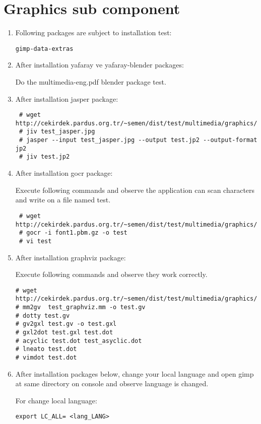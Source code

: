 \documentclass[a4paper,10pt]{article}
\begin{document}
\section{Graphics sub component}
\begin{enumerate}
\item Following packages are subject to installation test:
\begin{verbatim}
gimp-data-extras 
\end{verbatim}
\item After installation yafaray ve yafaray-blender packages:

Do the multimedia-eng.pdf blender package test.

\item After installation jasper package:

\begin{verbatim}
 # wget http://cekirdek.pardus.org.tr/~semen/dist/test/multimedia/graphics/test_jasper.jpg
 # jiv test_jasper.jpg
 # jasper --input test_jasper.jpg --output test.jp2 --output-format jp2
 # jiv test.jp2
\end{verbatim}


 \item After installation gocr package:

Execute following commands and observe the application can scan characters and write on a file named test.
\begin{verbatim}
 # wget http://cekirdek.pardus.org.tr/~semen/dist/test/multimedia/graphics/font1.pbm.gz
 # gocr -i font1.pbm.gz -o test
 # vi test
\end{verbatim}

\item After installation graphviz package:

Execute following commands and observe they work correctly.
\begin{verbatim}
# wget http://cekirdek.pardus.org.tr/~semen/dist/test/multimedia/graphics/test_graphviz.mm
# mm2gv  test_graphviz.mm -o test.gv
# dotty test.gv
# gv2gxl test.gv -o test.gxl 
# gxl2dot test.gxl test.dot
# acyclic test.dot test_asyclic.dot
# lneato test.dot
# vimdot test.dot
\end{verbatim}


\item After installation packages below, change your local language and open gimp at same directory on console and observe language is changed.

For change local language:
\begin{verbatim}
export LC_ALL= <lang_LANG>
\end{verbatim}


\end{enumerate}
\end{document}

